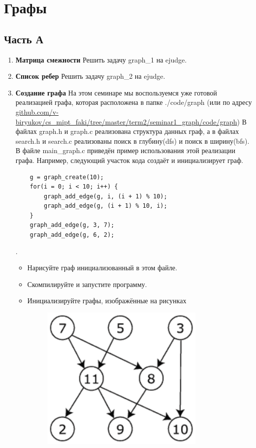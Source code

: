 \documentclass[12pt]{article}
\begin{document}

\section*{Графы}
\subsection*{Часть А}

\begin{enumerate}
\item \textbf{Матрица смежности} Решить задачу graph\_1 на ejudge.
\item \textbf{Список ребер} Решить задачу graph\_2 на ejudge.
\item \textbf{Создание графа} На этом семинаре мы воспользуемся уже готовой реализацией графа, которая расположена в папке ./code/graph (или по адресу \\ \href{github.com/v-biryukov/cs_mipt_faki/tree/master/term2/seminar1_graph/code/graph}{github.com/v-biryukov/cs\_mipt\_faki/tree/master/term2/seminar1\_graph/code/graph})
В файлах graph.h и graph.c реализована структура данных граф, а в файлах search.h и search.c реализованы поиск в глубину(dfs) и поиск в ширину(bfs).
В файле main\_graph.c приведён пример использования этой реализации графа. Например, следующий участок кода создаёт и инициализирует граф.
\begin{verbatim}
    g = graph_create(10);
    for(i = 0; i < 10; i++) {
        graph_add_edge(g, i, (i + 1) % 10);
        graph_add_edge(g, (i + 1) % 10, i);
    }
    graph_add_edge(g, 3, 7);
    graph_add_edge(g, 6, 2);
\end{verbatim}.
\begin{itemize}
\item Нарисуйте граф инициализованный в этом файле.
\item Скомпилируйте и запустите программу.
\item Инициализируйте графы, изображённые на рисунках
\begin{figure}[H]
    \centering
    \begin{minipage}{0.4\textwidth}
        \centering
        \includegraphics[width=0.8\textwidth]{simple_graph2} %

\end{minipage}
\end{figure}
\end{itemize}
\end{enumerate}
\end{document}
